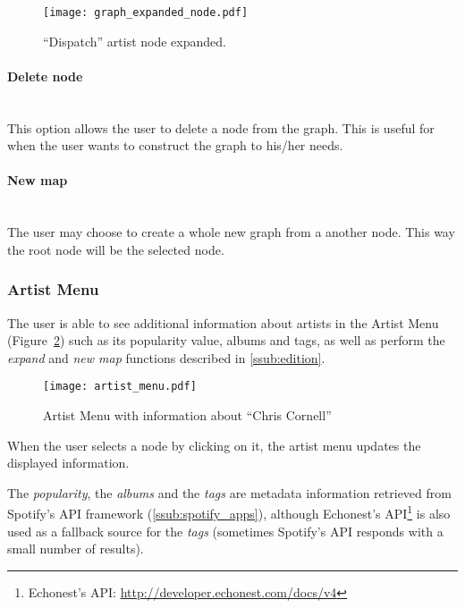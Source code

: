       \begin{figure}[b]
         \begin{center}
           \texttt{[image: graph\_expanded\_node.pdf]}
         \end{center}
         \caption{``Dispatch'' artist node expanded.}
         \label{fig:node_expanded}
      \end{figure}

      \paragraph{Delete node} \hfill \\
      This option allows the user to delete a node from the graph.
      This is useful for when the user wants to construct the graph to his/her needs.

      \paragraph{New map} \hfill \\
      The user may choose to create a whole new graph from a another node.
      This way the root node will be the selected node.



    \subsubsection{Artist Menu} %
      \label{ssub:artist_info}
      The user is able to see additional information about artists in the Artist Menu (Figure~\ref{fig:artist_menu}) such as its popularity value, albums and tags, as well as perform the \emph{expand} and \emph{new map} functions described in \ref{ssub:edition}.
      \begin{figure}[b]
        \begin{center}
          \texttt{[image: artist\_menu.pdf]}
        \end{center}
        \caption{Artist Menu with information about ``Chris Cornell''}
        \label{fig:artist_menu}
      \end{figure}
      When the user selects a node by clicking on it, the artist menu updates the displayed information.

      The \emph{popularity}, the \emph{albums} and the \emph{tags} are metadata information retrieved from Spotify's API framework (\ref{ssub:spotify_apps}), although Echonest's API\footnote{Echonest's API: \url{http://developer.echonest.com/docs/v4}} is also used as a fallback source for the \emph{tags} (sometimes Spotify's API responds with a small number of results).

